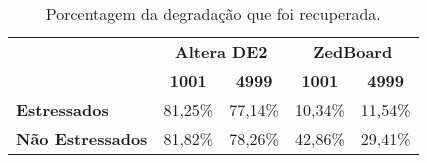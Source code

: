\begin{table}[H]
\centering
\caption{Porcentagem da degradação que foi recuperada.}
\begin{tabular}{l|cc|cc|}
\cline{2-5}
 & \multicolumn{2}{c|}{\textbf{Altera DE2}} & \multicolumn{2}{c|}{\textbf{ZedBoard}} \\ \cline{2-5} 
 & \multicolumn{1}{c|}{\textbf{1001}} & \textbf{4999} & \multicolumn{1}{c|}{\textbf{1001}} & \textbf{4999} \\ \hline
\multicolumn{1}{|l|}{\multirow{2}{*}{\textbf{Estressados}}} & \multicolumn{1}{c|}{\multirow{2}{*}{81,25\%}} & \multirow{2}{*}{77,14\%} & \multicolumn{1}{c|}{\multirow{2}{*}{10,34\%}} & \multirow{2}{*}{11,54\%} \\
\multicolumn{1}{|l|}{} & \multicolumn{1}{c|}{} &  & \multicolumn{1}{c|}{} &  \\ \hline
\multicolumn{1}{|l|}{\multirow{2}{*}{\textbf{Não Estressados}}} & \multicolumn{1}{c|}{\multirow{2}{*}{81,82\%}} & \multirow{2}{*}{78,26\%} & \multicolumn{1}{c|}{\multirow{2}{*}{42,86\%}} & \multirow{2}{*}{29,41\%} \\
\multicolumn{1}{|l|}{} & \multicolumn{1}{c|}{} &  & \multicolumn{1}{c|}{} &  \\ \hline
\end{tabular}
\label{tab:RelaxProp}
\end{table}